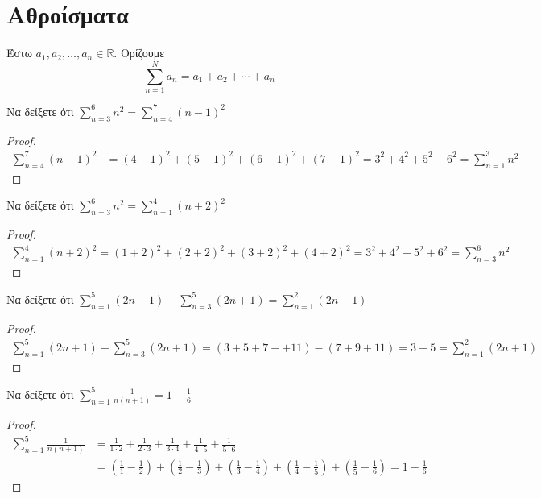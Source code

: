 \documentclass[main.tex]{subfiles}
\begin{document}
\section{Αθροίσματα}

\begin{dfn}
    Έστω $ a_{1}, a_{2}, \ldots, a_{n} \in \mathbb{R} $. Ορίζουμε 
    \[ \sum_{n=1}^{N} a_{n} = a_{1} + a_{2} + \cdots + a_{n} \]
\end{dfn}

\begin{example}
    Να δείξετε ότι $ \sum_{n=3}^{6} n^{2} = \sum_{n=4}^{7} (n-1)^{2}   $
\end{example}

\begin{proof}
    \begin{align*}
        \sum_{n=4}^{7} (n-1)^{2} &= (4-1)^{2}+(5-1)^{2}+(6-1)^{2}+(7-1)^{2} 
        = 3^{2}+4^{2}+5^{2}+6^{2} = \sum_{n=1}^{3} n^{2} 
    \end{align*}
\end{proof}

\begin{example}
    Να δείξετε ότι $ \sum_{n=3}^{6} n^{2} = \sum_{n=1}^{4} (n+2)^{2}   $
\end{example}

\begin{proof}
    \begin{align*}
        \sum_{n=1}^{4} (n+2)^{2} = (1+2)^{2}+(2+2)^{2}+(3+2)^{2}+(4+2)^{2}=
        3^{2}+4^{2}+5^{2}+6^{2} = \sum_{n=3}^{6} n^{2} 
    \end{align*}
\end{proof}

\begin{example}
    Να δείξετε ότι $ \sum_{n=1}^{5} (2n+1) - \sum_{n=3}^{5} (2n+1)  =  
    \sum_{n=1}^{2} (2n+1) $
\end{example}

\begin{proof}
    \begin{align*}
        \sum_{n=1}^{5} (2n+1)- \sum_{n=3}^{5} (2n+1) = 
        (3+5+7++11) - (7+9+11) = 3 + 5 = \sum_{n=1}^{2} (2n+1) 
    \end{align*}
\end{proof}

\begin{example}
    Να δείξετε ότι $ \sum_{n=1}^{5} \frac{1}{n(n+1)} = 1 - \frac{1}{6}  $
\end{example}

\begin{proof}
    \begin{align*}
        \sum_{n=1}^{5} \frac{1}{n(n+1)} 
        &= \frac{1}{1\cdot 2} + \frac{1}{2 \cdot 3} + \frac{1}{3 \cdot 4} 
        + \frac{1}{4 \cdot 5} + \frac{1}{5 \cdot 6} \\
        &= \left(\frac{1}{1} - \frac{1}{2}\right) + \left(\frac{1}{2} 
        - \frac{1}{3} \right) + \left(\frac{1}{3} - \frac{1}{4}\right) 
        + \left(\frac{1}{4} - \frac{1}{5}\right) +
        \left(\frac{1}{5} - \frac{1}{6}\right)  = 1 - \frac{1}{6}
    \end{align*}
\end{proof}
\end{document}
